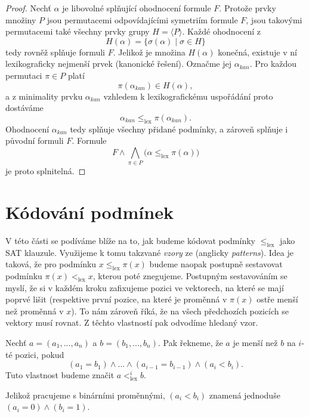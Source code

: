 \begin{proof} Nechť $\alpha$ je libovolné splňující ohodnocení formule $F$. Protože prvky množiny $P$ jsou permutacemi odpovídajícími symetriím formule $F$, jsou takovými permutacemi také všechny prvky grupy $H = \langle P \rangle$. Každé ohodnocení z \[ H(\alpha) = \{ \sigma(\alpha) \mid \sigma \in H \} \] tedy rovněž splňuje formuli $F$. Jelikož je množina $H(\alpha)$ konečná, existuje v ní lexikograficky nejmenší prvek (kanonické řešení). Označme jej $\alpha_{kan}$. Pro každou permutaci $\pi \in P$ platí \[ \pi(\alpha_{kan}) \in H(\alpha), \] a z minimality prvku $\alpha_{kan}$ vzhledem k lexikografickému uspořádání proto dostáváme \[ \alpha_{kan} \leq_{\mathrm{lex}} \pi(\alpha_{kan}). \] Ohodnocení $\alpha_{kan}$ tedy splňuje všechny přidané  podmínky, a zároveň splňuje i původní formuli $F$. Formule \[ F \land \bigwedge_{\pi \in P} \bigl( \alpha \leq_{\text{lex}} \pi(\alpha) \bigr) \] je proto splnitelná. \end{proof}

\section{Kódování podmínek}
V této části se podíváme blíže na to, jak budeme kódovat podmínky $\leq_{\text{lex}}$ jako SAT klauzule. Využijeme k tomu takzvané \emph{vzory} ze \cite{codish2025breakingsymmetriessetcoveringperspective} (anglicky \emph{patterns}). Idea je taková, že pro podmínku $x \leq_{\text{lex}} \pi(x)$ budeme naopak postupně sestavovat podmínku $\pi(x) <_{\text{lex}} x$, kterou poté znegujeme. Postupným sestavováním se myslí, že si v každém kroku zafixujeme pozici ve vektorech, na které se mají poprvé lišit (respektive první pozice, na které je proměnná v $\pi(x)$ ostře menší než proměnná v $x$). To nám zároveň říká, že na všech předchozích pozicích se vektory musí rovnat. Z těchto vlastností pak odvodíme hledaný vzor. 

\begin{definice}
Nechť $a = (a_1,...,a_n)$ a $b = (b_1,...,b_n)$. Pak řekneme, že $a$ je menší než $b$ na $i$-té pozici, pokud
$$(a_1 = b_1) \land ... \land (a_{i-1} = b_{i-1}) \land (a_i < b_i).$$
Tuto vlastnost budeme značit $a <_{\text{lex}}^{i} b$.
\end{definice}

\begin{pozn}
Jelikož pracujeme s binárními proměnnými, $(a_i < b_i)$ znamená jednoduše $(a_i = 0) \land (b_i = 1)$.
\end{pozn}

